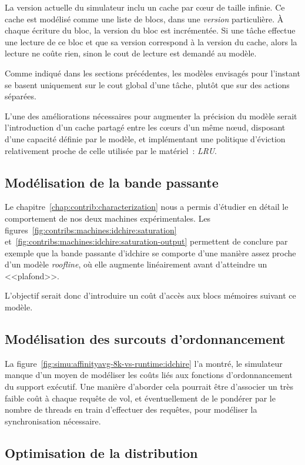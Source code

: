 La version actuelle du simulateur inclu un cache par cœur de taille infinie.
Ce cache est modélisé comme une liste de blocs, dans une \emph{version} particulière.
À chaque écriture du bloc, la version du bloc est incrémentée.
Si une tâche effectue une lecture de ce bloc et que sa version correspond à la version du cache, alors la lecture ne coûte rien, sinon le cout de lecture est demandé au modèle.

Comme indiqué dans les sections précédentes, les modèles envisagés pour l'instant se basent uniquement sur le cout global d'une tâche, plutôt que sur des actions séparées.

L'une des améliorations nécessaires pour augmenter la précision du modèle serait l'introduction d'un cache partagé entre les cœurs d'un même nœud, disposant d'une capacité définie par le modèle, et implémentant une politique d'éviction relativement proche de celle utilisée par le matériel~: \emph{LRU}.

\subsection{Modélisation de la bande passante}

Le chapitre~\ref{chap:contrib:characterization} nous a permis d'étudier en détail le comportement de nos deux machines expérimentales.
Les figures~\ref{fig:contribs:machines:idchire:saturation} et~\ref{fig:contribs:machines:idchire:saturation-output} permettent de conclure par exemple que la bande passante d'idchire se comporte d'une manière assez proche d'un modèle \emph{roofline}, où elle augmente linéairement avant d'atteindre un <<plafond>>.

L'objectif serait donc d'introduire un coût d'accès aux blocs mémoires suivant ce modèle.

\subsection{Modélisation des surcouts d'ordonnancement}

La figure~\ref{fig:simu:affinityavg-8k-vs-runtime:idchire} l'a montré, le simulateur manque d'un moyen de modéliser les coûts liés aux fonctions d'ordonnancement du support exécutif.
Une manière d'aborder cela pourrait être d'associer un très faible coût à chaque requête de vol, et éventuellement de le pondérer par le nombre de threads en train d'effectuer des requêtes, pour modéliser la synchronisation nécessaire.

\subsection{Optimisation de la distribution}


